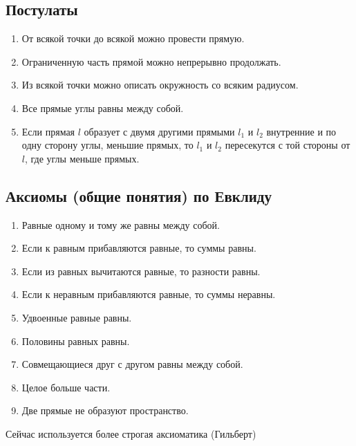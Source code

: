 \documentclass[a4paper, 12pt]{article}
\theoremstyle{definition}
\begin{document}
	\subsection{Постулаты}
	\begin{enumerate}
	\item От всякой точки до всякой можно провести прямую.
	
	\item Ограниченную часть прямой можно непрерывно продолжать.
	
	\item Из всякой точки можно описать окружность со всяким радиусом.
	
	\item Все прямые углы равны между собой.
	
	\item Если прямая $l$ образует с двумя другими прямыми $l_{1}$ и $l_{2}$ внутренние и по одну сторону углы, меньшие прямых, то $l_{1}$ и $l_{2}$ пересекутся с той стороны от $l$, где углы меньше прямых.   
	\end{enumerate}
	
	\subsection{Аксиомы (общие понятия) по Евклиду}
	\begin{enumerate}
		\item Равные одному и тому же равны между собой.
		\item Если к равным прибавляются равные, то суммы равны.
		\item Если из равных вычитаются равные, то разности равны.
		\item Если к неравным прибавляются равные, то суммы неравны.
		\item Удвоенные равные равны.
		\item Половины равных равны.
		\item Совмещающиеся друг с другом равны между собой.
		\item Целое больше части.
		\item Две прямые не образуют пространство.
	\end{enumerate}
	Сейчас используется более строгая аксиоматика (Гильберт)
	
\end{document}
